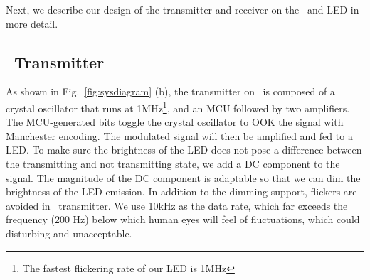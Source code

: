 Next, we describe our design of the transmitter and receiver on the \vitag\ and LED in more detail.





\subsection{\reader\ Transmitter}
\label{subsec:LEDtrans}

As shown in Fig.~\ref{fig:sysdiagram} (b), the transmitter on \reader\ is composed of a crystal oscillator that runs at 1MHz\footnote{The fastest flickering rate of our LED is 1MHz}, and an MCU followed by two amplifiers. The MCU-generated bits toggle the crystal oscillator to OOK the signal with Manchester encoding. The modulated signal will then be amplified and fed to a LED. To make sure the brightness of the LED does not pose a difference between the transmitting and not transmitting state, we add a DC component to the signal. The magnitude of the DC component is adaptable so that we can dim the brightness of the LED emission. In addition to the dimming support, flickers are avoided in \reader\ transmitter. We use 10kHz as the data rate, which far exceeds the frequency (200 Hz) below which human eyes will feel of fluctuations, which could disturbing and unacceptable. 






